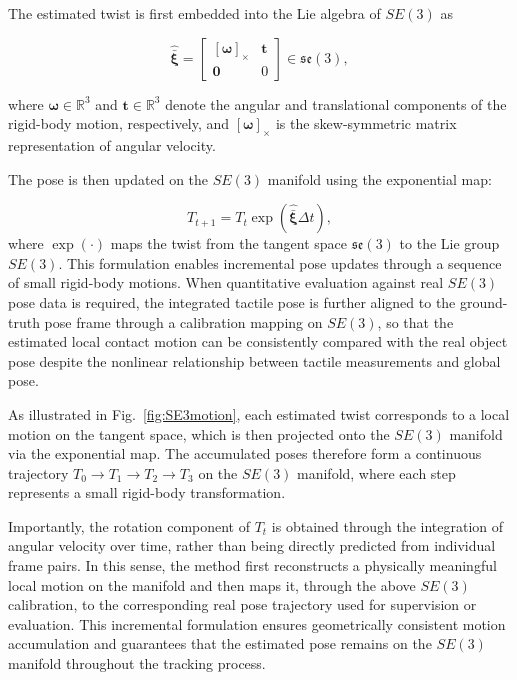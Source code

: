 \documentclass[letterpaper,10pt,journal,twoside]{IEEEtran}
\begin{document}
The estimated twist is first embedded into the Lie algebra of $SE(3)$ as

\begin{equation}
\hat{\bar{\boldsymbol{\xi}}} =
\begin{bmatrix}
[\boldsymbol{\omega}]_\times & \mathbf{t} \\
\mathbf{0} & 0
\end{bmatrix}
\in \mathfrak{se}(3),
\end{equation}

where $\boldsymbol{\omega} \in \mathbb{R}^3$ and $\mathbf{t} \in \mathbb{R}^3$ denote the angular and translational components of the rigid-body motion, respectively, and $[\boldsymbol{\omega}]_\times$ is the skew-symmetric matrix representation of angular velocity.

The pose is then updated on the $SE(3)$ manifold using the exponential map:

\begin{equation}
T_{t+1} = T_t \exp\left(\hat{\bar{\boldsymbol{\xi}}} \Delta t\right),
\end{equation}
where $\exp(\cdot)$ maps the twist from the tangent space $\mathfrak{se}(3)$ to the Lie group $SE(3)$. 
This formulation enables incremental pose updates through a sequence of small rigid-body motions. When quantitative evaluation against real $SE(3)$ pose data is required, the integrated tactile pose is further aligned to the ground-truth pose frame through a calibration mapping on $SE(3)$, so that the estimated local contact motion can be consistently compared with the real object pose despite the nonlinear relationship between tactile measurements and global pose.

As illustrated in Fig.~\ref{fig:SE3motion}, each estimated twist corresponds to a local motion on the tangent space, which is then projected onto the $SE(3)$ manifold via the exponential map. The accumulated poses therefore form a continuous trajectory 
\(
T_0 \rightarrow T_1 \rightarrow T_2 \rightarrow T_3
\)
on the $SE(3)$ manifold, where each step represents a small rigid-body transformation.

Importantly, the rotation component of $T_t$ is obtained through the integration of angular velocity over time, rather than being directly predicted from individual frame pairs. In this sense, the method first reconstructs a physically meaningful local motion on the manifold and then maps it, through the above $SE(3)$ calibration, to the corresponding real pose trajectory used for supervision or evaluation. This incremental formulation ensures geometrically consistent motion accumulation and guarantees that the estimated pose remains on the $SE(3)$ manifold throughout the tracking process.
\end{document}
